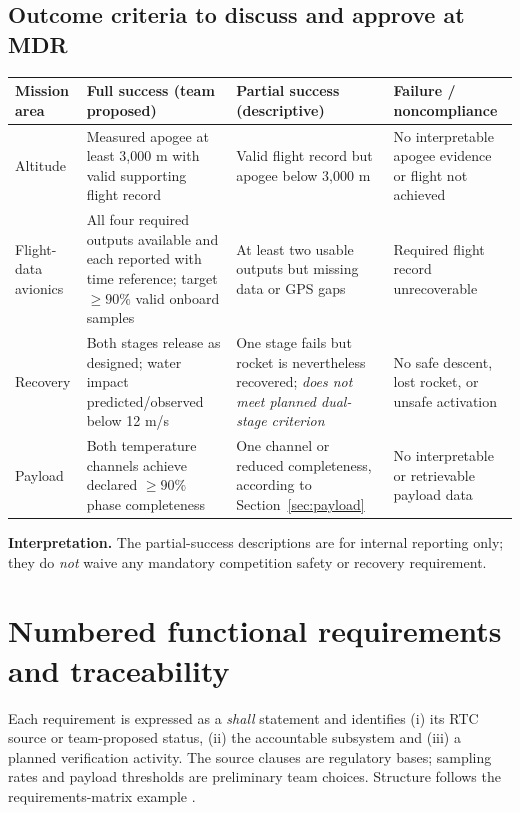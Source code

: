 \subsection*{Outcome criteria to discuss and approve at MDR}
\small
\begin{tabularx}{\linewidth}{@{}L{26mm}Y Y Y@{}}
\toprule{}\textbf{Mission area}&\textbf{Full success (team proposed)}&\textbf{Partial success (descriptive)}&\textbf{Failure / noncompliance}\\\midrule
Altitude & Measured apogee at least 3,000 m with valid supporting flight record & Valid flight record but apogee below 3,000 m & No interpretable apogee evidence or flight not achieved\\
Flight-data avionics & All four required outputs available and each reported with time reference; target $\ge90\%$ valid onboard samples & At least two usable outputs but missing data or GPS gaps & Required flight record unrecoverable\\
Recovery & Both stages release as designed; water impact predicted/observed below 12 m/s & One stage fails but rocket is nevertheless recovered; \emph{does not meet planned dual-stage criterion} & No safe descent, lost rocket, or unsafe activation\\
Payload & Both temperature channels achieve declared $\ge90\%$ phase completeness & One channel or reduced completeness, according to Section~\ref{sec:payload} & No interpretable or retrievable payload data\\\bottomrule
\end{tabularx}
\normalsize
\textbf{Interpretation.} The partial-success descriptions are for internal reporting only; they do \emph{not} waive any mandatory competition safety or recovery requirement.


\section{Numbered functional requirements and traceability}
\label{sec:reqmatrix}
Each requirement is expressed as a \emph{shall} statement and identifies (i) its RTC source or team-proposed status, (ii) the accountable subsystem and (iii) a planned verification activity. The source clauses are regulatory bases; sampling rates and payload thresholds are preliminary team choices. Structure follows the requirements-matrix example \cite{rtc2027app10}.

